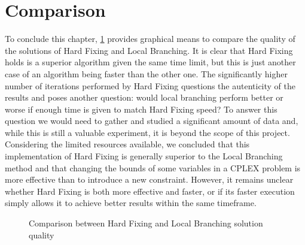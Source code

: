 \section{Comparison}
To conclude this chapter, \figurename{ \ref{fig:hardFixLocBranchCMP}} provides graphical means to compare the quality of the solutions of Hard Fixing and Local Branching.
It is clear that Hard Fixing holds is a superior algorithm given the same time limit, but this is just another case of an algorithm being faster than the other one.
The significantly higher number of iterations performed by Hard Fixing questions the autenticity of the results and poses another question: would local branching perform better or worse if enough time is given to match Hard Fixing speed?
To answer this question we would need to gather and studied a significant amount of data and, while this is still a valuable experiment, it is beyond the scope of this project.
Considering the limited resources available, we concluded that this implementation of Hard Fixing is generally superior to the Local Branching method and that changing the bounds of some variables in a CPLEX problem is more effective than to introduce a new constraint.
However, it remains unclear whether Hard Fixing is both more effective and faster, or if its faster execution simply allows it to achieve better results within the same timeframe.

\begin{figure}[htbp]
	\centering
	\caption{Comparison between Hard Fixing and Local Branching solution quality \label{fig:hardFixLocBranchCMP}}
\end{figure}

